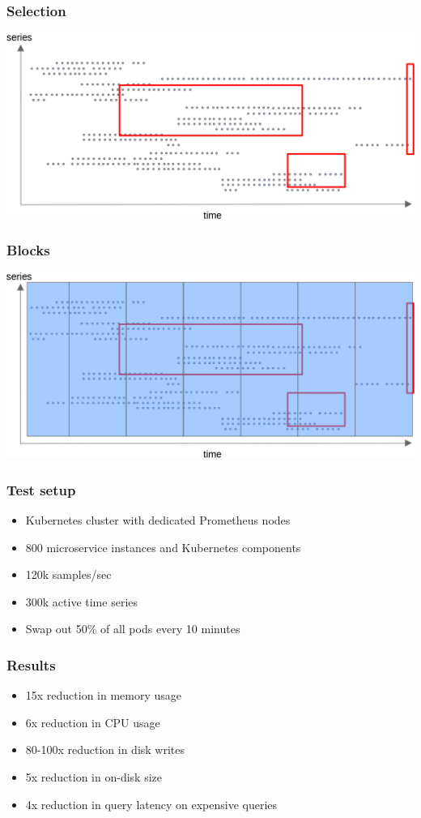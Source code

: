 \documentclass[t]{beamer}
\begin{document}
\begin{frame}
	\frametitle{Selection}
	\includegraphics[width=\textwidth]{storage--file_per_series_with_selection.png}
\end{frame}

\begin{frame}
	\frametitle{Blocks}
	\includegraphics[width=\textwidth]{storage--block_with_selection.png}
\end{frame}

\begin{frame}
	\frametitle{Test setup}
	\begin{itemize}
		\item Kubernetes cluster with dedicated Prometheus nodes
		\item 800 microservice instances and Kubernetes components
		\item 120k samples/sec
		\item 300k active time series
		\item Swap out 50\% of all pods every 10 minutes
	\end{itemize}
\end{frame}

\begin{frame}
	\frametitle{Results}
	\begin{itemize}
		\item 15x reduction in memory usage
		\item 6x reduction in CPU usage
		\item 80-100x reduction in disk writes
		\item 5x reduction in on-disk size
		\item 4x reduction in query latency on expensive queries
	\end{itemize}
\end{frame}
\end{document}
